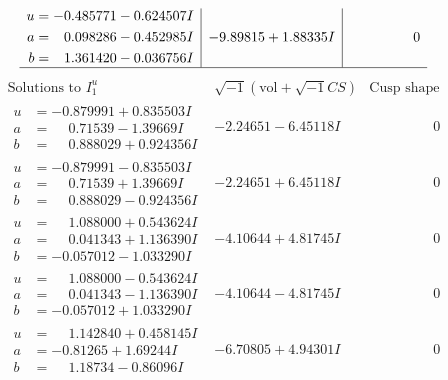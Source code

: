 \documentclass[1p]{elsarticle_modified}
\theoremstyle{definition}
\newcommand{\I}{\sqrt{-1}}
\begin{document}
$$\begin{array}{c|c|c}
\begin{aligned}
u &= -0.485771 - 0.624507 I \\
a &= \phantom{-}0.098286 - 0.452985 I \\
b &= \phantom{-}1.361420 - 0.036756 I\end{aligned}
 & -9.89815 + 1.88335 I & \phantom{-0.000000 } 0\\
 \hline 
 \end{array}$$\newpage$$\begin{array}{c|c|c}  
\text{Solutions to }I^u_{1}& \I (\text{vol} + \sqrt{-1}CS) & \text{Cusp shape}\\
 \hline 
\begin{aligned}
u &= -0.879991 + 0.835503 I \\
a &= \phantom{-}0.71539 - 1.39669 I \\
b &= \phantom{-}0.888029 + 0.924356 I\end{aligned}
 & -2.24651 - 6.45118 I & \phantom{-0.000000 } 0 \\ \hline\begin{aligned}
u &= -0.879991 - 0.835503 I \\
a &= \phantom{-}0.71539 + 1.39669 I \\
b &= \phantom{-}0.888029 - 0.924356 I\end{aligned}
 & -2.24651 + 6.45118 I & \phantom{-0.000000 } 0 \\ \hline\begin{aligned}
u &= \phantom{-}1.088000 + 0.543624 I \\
a &= \phantom{-}0.041343 + 1.136390 I \\
b &= -0.057012 - 1.033290 I\end{aligned}
 & -4.10644 + 4.81745 I & \phantom{-0.000000 } 0 \\ \hline\begin{aligned}
u &= \phantom{-}1.088000 - 0.543624 I \\
a &= \phantom{-}0.041343 - 1.136390 I \\
b &= -0.057012 + 1.033290 I\end{aligned}
 & -4.10644 - 4.81745 I & \phantom{-0.000000 } 0 \\ \hline\begin{aligned}
u &= \phantom{-}1.142840 + 0.458145 I \\
a &= -0.81265 + 1.69244 I \\
b &= \phantom{-}1.18734 - 0.86096 I\end{aligned}
 & -6.70805 + 4.94301 I & \phantom{-0.000000 } 0 \\ \hline\begin{aligned}

\end{aligned}
\end{array}$$
\end{document}
